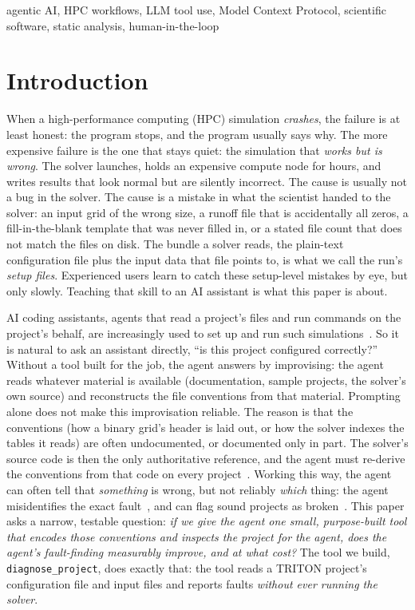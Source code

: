 \documentclass[conference]{IEEEtran}
\begin{document}
\begin{IEEEkeywords}
agentic AI, HPC workflows, LLM tool use, Model Context Protocol, scientific software,
static analysis, human-in-the-loop
\end{IEEEkeywords}

\section{Introduction}
\label{sec:intro}

When a high-performance computing (HPC) simulation \emph{crashes}, the failure is at least
honest: the program stops, and the program usually says why. The more expensive failure is the one
that stays quiet: the simulation that \emph{works but is wrong}. The solver launches, holds an
expensive compute node for hours, and writes results that look normal but are silently
incorrect. The cause is usually not a bug in the solver. The cause is a mistake in what the
scientist handed to the solver: an input grid of the wrong size, a runoff file that is accidentally
all zeros, a fill-in-the-blank template that was never filled in, or a stated file count that
does not match the files on disk. The bundle a solver reads, the plain-text
configuration file plus the input data that file points to, is what we call the run's
\emph{setup files}.
Experienced users learn to catch these setup-level mistakes by eye, but only slowly. Teaching
that skill to an AI assistant is what this paper is about.

AI coding assistants, agents that read a project's files and run commands on the project's
behalf, are increasingly used to set up and run such
simulations~\cite{lara,matclaw,mada,materials-aurora,mlipilot}. So it is natural to ask an
assistant directly, ``is this project configured correctly?'' Without a tool built for the job,
the agent answers by improvising: the agent reads whatever material is available (documentation,
sample projects, the solver's own source) and reconstructs the file conventions from that
material. Prompting alone does not make this improvisation reliable. The reason is that the
conventions (how a binary grid's header is laid out, or how the solver indexes the tables it
reads) are often undocumented, or documented only in part. The solver's source code is then the
only authoritative reference, and the agent must re-derive the conventions from that code on
every project~\cite{matclaw}. Working this way, the agent can often tell that \emph{something} is
wrong, but not reliably \emph{which} thing: the agent misidentifies the exact
fault~\cite{swebench,sweagent}, and can flag sound projects as
broken~\cite{sast-llm-compare}. This paper asks a narrow, testable question: \emph{if we give the
agent one small, purpose-built tool that encodes those conventions and inspects the project for
the agent, does the agent's fault-finding measurably improve, and at what cost?} The tool we
build, \texttt{diagnose\_project}, does exactly that: the tool reads a TRITON project's
configuration file and input files and reports faults \emph{without ever running the solver}.
\end{document}
